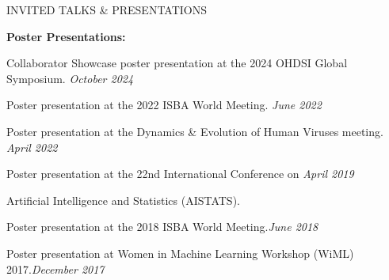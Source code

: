 \documentclass{resume} %
\begin{document}
\begin{rSection}{INVITED TALKS \& PRESENTATIONS}
	
	
	
	
	\medskip
	
	\hspace*{-0.2in}\textbf{Poster Presentations:}
	
	Collaborator Showcase poster presentation at the 2024 OHDSI Global Symposium.  \hfill {\em October 2024}
	
	Poster presentation at the 2022 ISBA World Meeting. \hfill {\em June 2022}
	
	Poster presentation at the Dynamics \& Evolution of Human Viruses meeting.  \hfill {\em April 2022}
	
	
	Poster presentation at the 22nd International Conference on   \hfill {\em April 2019}
	
	\vspace{-0.1in}
	Artificial Intelligence and Statistics (AISTATS).
	
	
	
	Poster presentation at the 2018 ISBA World Meeting.\hfill {\em June 2018}
	
	Poster presentation at Women in Machine Learning Workshop (WiML) 2017.\hfill {\em December 2017}
	
\end{rSection}











\end{document}

